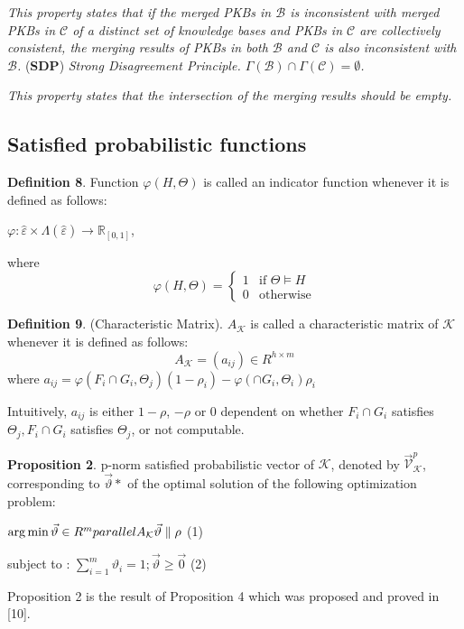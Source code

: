 \documentclass[]{iosart2c}
\begin{document}
  \textit{This property states that if the merged PKBs in $\mathcal{B}$ is inconsistent with merged PKBs in $\mathcal{C}$ of a distinct set of knowledge bases and PKBs in $\mathcal{C}$ are collectively consistent, the merging results of PKBs in both $\mathcal{B}$ and $\mathcal{C}$ is also inconsistent with $\mathcal{B}$.
  }
  (\textbf{SDP}) \textit{Strong Disagreement Principle. $\Gamma(\mathcal{B}) \cap \Gamma(\mathcal{C}) = \emptyset$.}

  \textit{This property states that the intersection of the merging results should be empty.
  }

  \subsection{Satisfied probabilistic functions}

  \textbf{Definition 8}. Function $\varphi(H,\Theta)$ is called an indicator function whenever it is defined as follows:

  $\varphi : \hat{\varepsilon} \times \Lambda(\hat{\varepsilon}) \to \mathbb{R}_{[0,1]}$,

  where $$\varphi(H,\Theta) =
  \begin{cases}
    1    &\text{if $\Theta \models H$} \\
    0    &\text{otherwise}
  \end{cases}
  $$

  \textbf{Definition 9}. (Characteristic Matrix). $A_\mathcal{K}$ is called a characteristic matrix of $\mathcal{K}$ whenever it is defined as follows:
  $$
  A_\mathcal{K} = (a_{ij}) \in R^{h \times m}
  $$
  where
  $a_{ij} = \varphi(F_i \cap G_i,\Theta_j)(1 - \rho_i) - \varphi(\cap G_i,\Theta_i)\rho_i$

  Intuitively, $a_{ij}$ is either $1-\rho$, $-\rho$ or 0 dependent on whether $F_i \cap G_i$ satisfies $\Theta_j, F_i \cap G_i$ satisfies $\Theta_j$, or not computable.

  \textbf{Proposition 2}. p-norm satisfied probabilistic vector of $\mathcal{K}$, denoted by $\vec{\mathcal{V}}^p_\mathcal{K}$, corresponding to $\vec{\vartheta}*$ of the optimal solution of the following optimization problem:

  $\arg \min\vec{\vartheta}\in R^m\\parallel A_\mathcal{K} \vec{\vartheta}\parallel\rho$ (1)

  subject to : $\sum^m_{i=1}\vartheta_i = 1; \vec{\vartheta}\geq\vec{0}$ (2)

  Proposition 2 is the result of Proposition 4 which was proposed and proved in [10].
\end{document}
